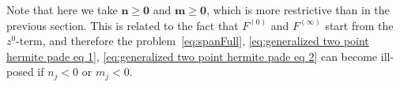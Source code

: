 \documentclass[reqno,centertags,11pt,draft]{amsart}
\newcommand{\abs}[1]{\left|#1\right|}
\begin{document}
Note that here we take $\bm{n}\ge\bm{0}$ and $\bm{m}\ge \bm{0}$, which is more restrictive than in the previous section. This is related to the fact that $F^{(0)}$ and $F^{(\infty)}$ start from the $z^0$-term, and therefore the problem~\eqref{eq:spanFull}, \eqref{eq:generalized two point hermite pade eq 1}, \eqref{eq:generalized two point hermite pade eq 2} can become ill-posed if $n_j<0$ or $m_j<0$. 

 

\end{document}
